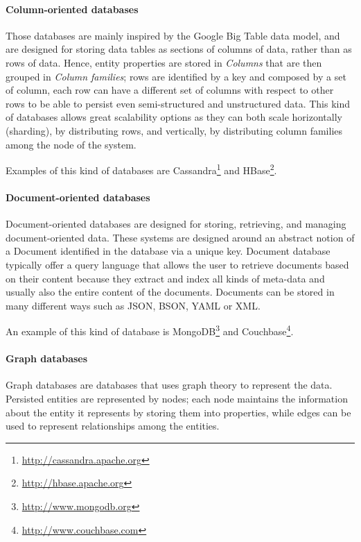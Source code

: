 \paragraph{Column-oriented databases} Those databases are mainly inspired by the Google Big Table \cite{paper:bigtable} data model, and are designed for storing data tables as sections of columns of data, rather than as rows of data. Hence, entity properties are stored in \textit{Columns} that are then grouped in \textit{Column families}; rows are identified by a key and composed by a set of column, each row can have a different set of columns with respect to other rows to be able to persist even semi-structured and unstructured data.
This kind of databases allows great scalability options as they can both scale horizontally (sharding), by distributing rows, and vertically, by distributing column families among the node of the system.

\noindent Examples of this kind of databases are Cassandra\footnote{\url{http://cassandra.apache.org}} and HBase\footnote{\url{http://hbase.apache.org}}.

\paragraph{Document-oriented databases} Document-oriented databases are designed for storing, retrieving, and managing document-oriented data. These systems are designed around an abstract notion of a Document identified in the database via a unique key. 
Document database typically offer a query language that allows the user to retrieve documents based on their content because they extract and index all kinds of meta-data and usually also the entire content of the documents. 
Documents can be stored in many different ways such as JSON, BSON, YAML or XML.

\noindent An example of this kind of database is MongoDB\footnote{\url{http://www.mongodb.org}} and Couchbase\footnote{\url{http://www.couchbase.com}}.

\paragraph{Graph databases}  Graph databases are databases that uses graph theory to represent the data.
Persisted entities are represented by nodes; each node maintains the information about the entity it represents by storing them into properties, while edges can be used to represent relationships among the entities.


